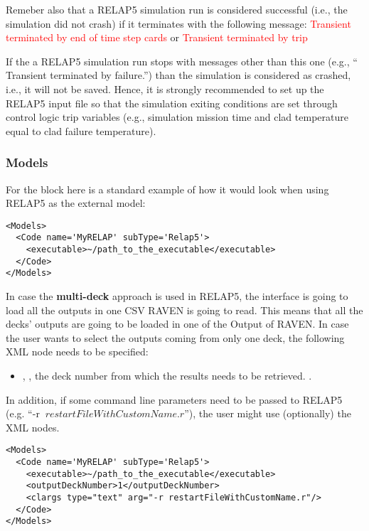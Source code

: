 Remeber also that a RELAP5 simulation run is considered successful (i.e., the simulation did not crash) if it terminates with the following
message:
\textcolor{red}{Transient terminated by end of time step cards}
or
\textcolor{red}{Transient terminated by trip}

If the a RELAP5 simulation run stops with messages other than this one (e.g., `` Transient terminated by failure.'') than the simulation is considered as
crashed, i.e., it will not be saved.
Hence, it is strongly recommended to set up the RELAP5 input file so that the simulation exiting conditions are set through control logic trip variables
(e.g., simulation mission time and clad temperature equal to clad failure temperature).

\subsubsection{Models}
For the  block here is a standard example of how it would look
when using RELAP5 as the external model:
\begin{lstlisting}[style=XML]
<Models>
  <Code name='MyRELAP' subType='Relap5'>
    <executable>~/path_to_the_executable</executable>
  </Code>
</Models>
\end{lstlisting}
In case the \textbf{multi-deck} approach is used in RELAP5, the interface is going to load all the outputs in one CSV RAVEN is
going to read. This means that all the decks' outputs are going to be loaded in one of the Output of RAVEN. In case the user
wants to select the outputs coming from only one deck, the following XML node needs to be specified:
\begin{itemize}
   \item {}, , the deck number from
   which the results needs to be retrieved. .
\end{itemize}
In addition, if some command line parameters need to be passed to RELAP5 \\(e.g. ``-r
$\: restartFileWithCustomName.r$''), the user might use (optionally) the  XML nodes.
\begin{lstlisting}[style=XML]
<Models>
  <Code name='MyRELAP' subType='Relap5'>
    <executable>~/path_to_the_executable</executable>
    <outputDeckNumber>1</outputDeckNumber>
    <clargs type="text" arg="-r restartFileWithCustomName.r"/>
  </Code>
</Models>
\end{lstlisting}

